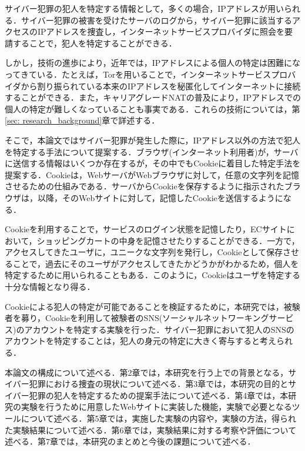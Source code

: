 \documentclass[10pt, a4paper]{jreport}
\begin{document}
サイバー犯罪の犯人を特定する情報として，多くの場合，IPアドレスが用いられる．サイバー犯罪の被害を受けたサーバのログから，サイバー犯罪に該当するアクセスのIPアドレスを捜査し，インターネットサービスプロバイダに照会を要請することで，犯人を特定することができる．

しかし，技術の進歩により，近年では，IPアドレスによる個人の特定は困難になってきている．たとえば，Torを用いることで，インターネットサービスプロバイダから割り振られている本来のIPアドレスを秘匿化してインターネットに接続することができる．また，キャリアグレードNATの普及により，IPアドレスでの個人の特定が難しくなっていることも事実である．これらの技術については，第\ref{sec: research_background}章で詳述する．

そこで，本論文ではサイバー犯罪が発生した際に，IPアドレス以外の方法で犯人を特定する手法について提案する．ブラウザ(インターネット利用者)が，サーバに送信する情報はいくつか存在するが，その中でもCookieに着目した特定手法を提案する．Cookieは，WebサーバがWebブラウザに対して，任意の文字列を記憶させるための仕組みである．サーバからCookieを保存するように指示されたブラウザは，以降，そのWebサイトに対して，記憶したCookieを送信するようになる．

Cookieを利用することで，サービスのログイン状態を記憶したり，ECサイトにおいて，ショッピングカートの中身を記憶させたりすることができる．一方で，アクセスしてきたユーザに，ユニークな文字列を発行し，Cookieとして保存させることで，過去にそのユーザがアクセスしてきたかどうかがわかるため，個人を特定するために用いられることもある．このように，Cookieはユーザを特定する十分な情報となり得る．

Cookieによる犯人の特定が可能であることを検証するために，本研究では，被験者を募り，Cookieを利用して被験者のSNS(ソーシャルネットワーキングサービス)のアカウントを特定する実験を行った．サイバー犯罪において犯人のSNSのアカウントを特定することは，犯人の身元の特定に大きく寄与すると考えられる．

本論文の構成について述べる．第2章では，本研究を行う上での背景となる，サイバー犯罪における捜査の現状について述べる．第3章では，本研究の目的とサイバー犯罪の犯人を特定するための提案手法について述べる．第4章では，本研究の実験を行うために用意したWebサイトに実装した機能，実験で必要となるツールについて述べる．第5章では，実施した実験の内容や，実験の方法，得られた実験結果について述べる．第6章では，実験結果に対する考察や評価について述べる．第7章では，本研究のまとめと今後の課題について述べる．
\end{document}
